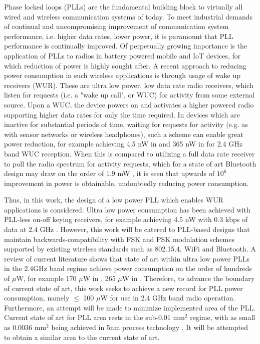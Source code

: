Phase locked loops (PLLs) are the fundamental building block to virtually all wired and wireless communication systems of today. To meet industrial demands of continual and uncompromising improvement of communication system performance, i.e. higher data rates, lower power, it is paramount that PLL performance is continually improved. Of perpetually growing importance is the application of PLLs to radios in battery powered mobile and IoT devices, for which reduction of power is highly sought after. A recent approach to reducing power consumption in such wireless applications is through usage of wake up receivers (WUR). These are ultra low power, low data rate radio receivers, which listen for requests (i.e. a "wake up call", or WUC) for activity from some external source. Upon a WUC, the device powers on and activates a higher powered radio supporting higher data rates for only the time required. In devices which are inactive for substantial periods of time, waiting for requests for activity (e.g. as with sensor networks or wireless headphones), such a scheme can enable great power reduction, for example achieving 4.5 nW in \cite{Jiang2017} and 365 nW in \cite{Sadagopan2017} for 2.4 GHz band WUC reception. When this is compared to utilizing a full data rate receiver to poll the radio spectrum for activity requests, which for a state of art Bluetooth design may draw on the order of 1.9 mW \cite{Tamura2020}, it is seen that upwards of $10^6$ improvement in power is obtainable, undoubtedly reducing power consumption.

Thus, in this work, the design of a low power PLL which enables WUR applications is considered. Ultra low power consumption has been achieved with PLL-less on-off keying receivers, for example achieving 4.5 nW with 0.3 kbps of data at 2.4 GHz \cite{Jiang2017}. However, this work will be catered to PLL-based designs that maintain backwards-compatibility with FSK and PSK modulation schemes supported by existing wireless standards such as 802.15.4, WiFi and Bluetooth. A review of current literature shows that state of art within ultra low power PLLs in the 2.4GHz band regime achieve power consumption on the order of hundreds of $\mu$W, for example 170 $\mu$W in \cite{Zhang2019}, 265 $\mu$W in \cite{Liu2019}. Therefore, to advance the boundary of current state of art, this work seeks to achieve a new record for PLL power consumption, namely $\leq$ 100 $\mu$W for use in 2.4 GHz band radio operation. Furthermore, an attempt will be made to minimize implemented area of the PLL. Current state of art for PLL area rests in the sub-0.01 mm$^2$ regime, with as small as 0.0036 mm$^2$ being achieved in 5nm process technology \cite{Liu2020}. It will be attempted to obtain a similar area to the current state of art.


